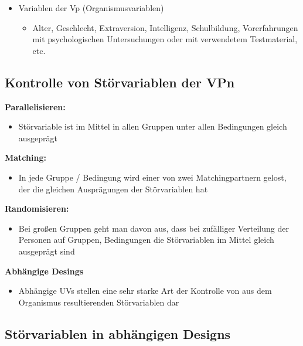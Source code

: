 \documentclass[
]{book}
\providecommand{\tightlist}{%
  \setlength{\itemsep}{0pt}\setlength{\parskip}{0pt}}
\begin{document}
\begin{itemize}
\item
  Variablen der Vp (Organismusvariablen)

  \begin{itemize}
  \tightlist
  \item
    Alter, Geschlecht, Extraversion, Intelligenz, Schulbildung, Vorerfahrungen mit psychologischen Untersuchungen oder mit verwendetem Testmaterial, etc.
  \end{itemize}
\end{itemize}

\hypertarget{kontrolle-von-stuxf6rvariablen-der-vpn}{%
\subsection{Kontrolle von Störvariablen der VPn}\label{kontrolle-von-stuxf6rvariablen-der-vpn}}

\textbf{Parallelisieren: }

\begin{itemize}
\tightlist
\item
  Störvariable ist im Mittel in allen Gruppen unter allen Bedingungen gleich
  ausgeprägt
\end{itemize}

\textbf{Matching:}

\begin{itemize}
\tightlist
\item
  In jede Gruppe / Bedingung wird einer von zwei Matchingpartnern gelost, der die
  gleichen Ausprägungen der Störvariablen hat
\end{itemize}

\textbf{Randomisieren:}

\begin{itemize}
\tightlist
\item
  Bei großen Gruppen geht man davon aus, dass bei zufälliger Verteilung der
  Personen auf Gruppen, Bedingungen die Störvariablen im Mittel gleich ausgeprägt sind
\end{itemize}

\textbf{Abhängige Desings}

\begin{itemize}
\tightlist
\item
  Abhängige UVs stellen eine sehr starke Art der Kontrolle von aus dem Organismus resultierenden Störvariablen dar
\end{itemize}

\hypertarget{stuxf6rvariablen-in-abhuxe4ngigen-designs}{%
\subsection{Störvariablen in abhängigen Designs}\label{stuxf6rvariablen-in-abhuxe4ngigen-designs}}
\end{document}
